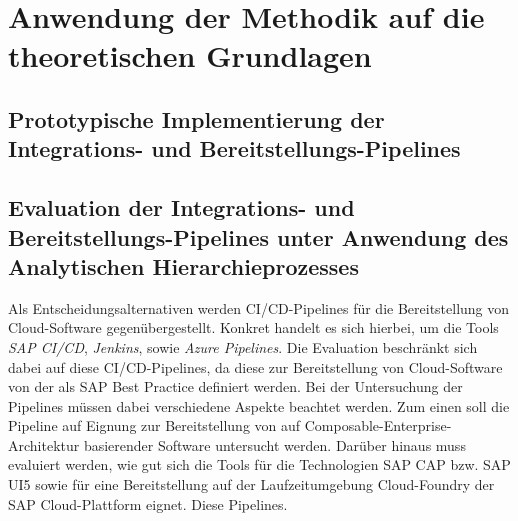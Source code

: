 \section{Anwendung der Methodik auf die theoretischen Grundlagen}

\subsection{Prototypische Implementierung der Integrations- und Bereitstellungs-Pipelines}
\subsection{Evaluation der Integrations- und Bereitstellungs-Pipelines unter Anwendung des Analytischen Hierarchieprozesses}
\label{sec:AHP}
Als Entscheidungsalternativen werden CI/CD-Pipelines für die Bereitstellung von Cloud-Software gegenübergestellt. Konkret handelt es sich hierbei, um die Tools \textit{SAP CI/CD}, \textit{Jenkins}, sowie \textit{Azure Pipelines}. Die Evaluation beschränkt sich dabei auf diese CI/CD-Pipelines, da diese zur Bereitstellung von Cloud-Software von der als SAP Best Practice definiert werden. Bei der Untersuchung der Pipelines müssen dabei verschiedene Aspekte beachtet werden. Zum einen soll die Pipeline auf Eignung zur Bereitstellung von auf Composable-Enterprise-Architektur basierender Software untersucht werden. Darüber hinaus muss evaluiert werden, wie gut sich die Tools für die Technologien SAP CAP bzw. SAP UI5 sowie für eine Bereitstellung auf der Laufzeitumgebung Cloud-Foundry der SAP Cloud-Plattform eignet. Diese Pipelines.
